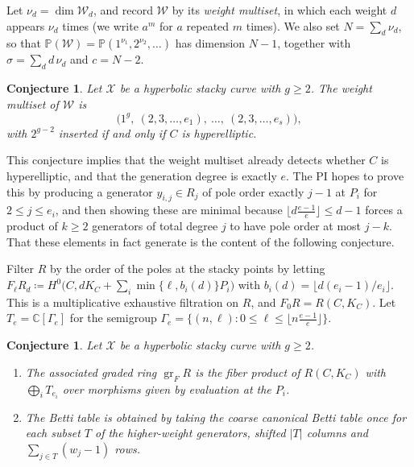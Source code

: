 \documentclass[11pt,reqno]{amsart}
\newtheorem{conjecture}[lemma]{Conjecture}
\theoremstyle{remark}
\newcommand{\CC}{\mathbb{C}}
\newcommand{\PP}{\mathbb{P}}
\newcommand{\cW}{\mathcal{W}}
\newcommand{\cX}{\mathcal{X}}
\begin{document}
Let $\nu_d = \dim \cW_d$, and record $\cW$ by its \emph{weight multiset}, in which each weight $d$ appears $\nu_d$ times (we write $a^m$ for $a$ repeated $m$ times). We also set $N = \sum_d \nu_d$, so that $\PP(\cW)=\PP(1^{\nu_1},2^{\nu_2},\ldots)$ has dimension $N-1$, together with $\sigma = \sum_d d\,\nu_d$ and $c = N-2$.

\begin{conjecture}\label{conj:weights}
Let $\cX$ be a hyperbolic stacky curve with $g\geq2$. The weight multiset of $\cW$ is
\[
	\big(1^{g},\ (2,3,\ldots,e_1),\ \ldots,\ (2,3,\ldots,e_s)\big),
\]
with $2^{g-2}$ inserted if and only if $C$ is hyperelliptic.
\end{conjecture}

This conjecture implies that the weight multiset already detects whether $C$ is hyperelliptic, and that the generation degree is exactly $e$. The PI hopes to prove this by producing a generator $y_{i,j}\in R_j$ of pole order exactly $j-1$ at $P_i$ for $2\leq j\leq e_i$, and then showing these are minimal because $\lfloor d\tfrac{e-1}{e}\rfloor\leq d-1$ forces a product of $k\geq2$ generators of total degree $j$ to have pole order at most $j-k$. That these elements in fact generate is the content of the following conjecture.

Filter $R$ by the order of the poles at the stacky points by letting $F_{\ell}R_d \coloneqq H^0\big(C,dK_C+\sum_i\min\{\ell,b_i(d)\}P_i\big)$ with $b_i(d)=\lfloor d(e_i-1)/e_i\rfloor$. This is a multiplicative exhaustive filtration on $R$, and $F_{0}R = R(C, K_C)$. Let $T_e = \CC[\Gamma_e]$ for the semigroup $\Gamma_e=\{(n,\ell):0\leq\ell\leq\lfloor n\tfrac{e-1}{e}\rfloor\}$. 

\begin{conjecture}\label{conj:degeneration}
Let $\cX$ be a hyperbolic stacky curve with $g\geq2$. 
\begin{enumerate}
\item The associated graded ring $\operatorname{gr}_FR$ is the fiber product of $R(C,K_C)$ with $\bigoplus_iT_{e_i}$ over morphisms given by evaluation at the $P_i$.
\item The Betti table is obtained by taking the coarse canonical Betti table once for each subset $T$ of the higher-weight generators, shifted $|T|$ columns and $\sum_{j\in T}(w_j-1)$ rows.
\end{enumerate}
\end{conjecture}
\end{document}
